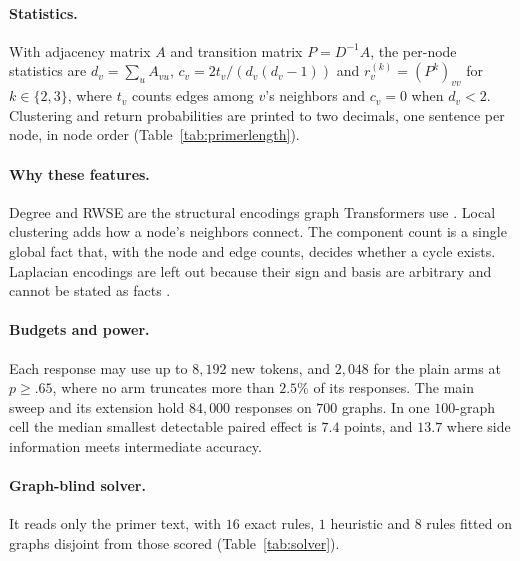 \documentclass[11pt]{article}
\begin{document}
\paragraph{Statistics.} With adjacency matrix $A$ and transition matrix $P=D^{-1}A$, the per-node statistics are $d_v=\sum_u A_{vu}$, $c_v=2t_v/(d_v(d_v-1))$ and $r_v^{(k)}=(P^k)_{vv}$ for $k\in\{2,3\}$, where $t_v$ counts edges among $v$'s neighbors and $c_v=0$ when $d_v<2$. Clustering and return probabilities are printed to two decimals, one sentence per node, in node order (Table~\ref{tab:primerlength}).

\paragraph{Why these features.} Degree and RWSE are the structural encodings graph Transformers use \citep{rampasek2022recipe}. Local clustering adds how a node's neighbors connect. The component count is a single global fact that, with the node and edge counts, decides whether a cycle exists. Laplacian encodings are left out because their sign and basis are arbitrary and cannot be stated as facts \citep{dwivedi2022graph}.

\paragraph{Budgets and power.} Each response may use up to $8{,}192$ new tokens, and $2{,}048$ for the plain arms at $p\geq.65$, where no arm truncates more than $2.5\%$ of its responses. The main sweep and its extension hold $84{,}000$ responses on $700$ graphs. %
In one $100$-graph cell the median smallest detectable paired effect is $7.4$ points, and $13.7$ where side information meets intermediate accuracy. %

\paragraph{Graph-blind solver.} It reads only the primer text, with $16$ exact rules, $1$ heuristic and $8$ rules fitted on graphs disjoint from those scored (Table~\ref{tab:solver}). %
\end{document}
